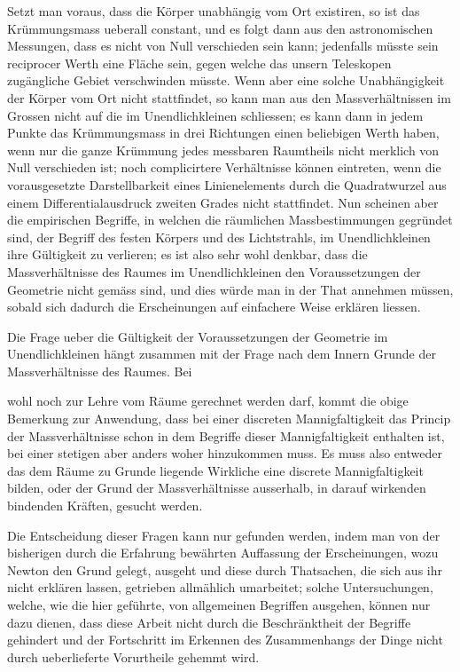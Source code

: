 \documentclass[12pt,a4paper]{article}
\begin{document}
Setzt man voraus, dass die K\"orper unabh\"angig vom Ort existiren, so ist das Kr\"ummungsmass ueberall constant, und es folgt dann aus den astronomischen Messungen, dass es nicht von Null verschieden sein kann; jedenfalls m\"usste sein reciprocer Werth eine Fl\"ache sein, gegen welche das unsern Teleskopen zug\"angliche Gebiet verschwinden m\"usste. Wenn aber eine solche Unabh\"angigkeit der K\"orper vom Ort nicht stattfindet, so kann man aus den Massverh\"altnissen im Grossen nicht auf die im Unendlichkleinen schliessen; es kann dann in jedem Punkte das Kr\"ummungsmass in drei Richtungen einen beliebigen Werth haben, wenn nur die ganze Kr\"ummung jedes messbaren Raumtheils nicht merklich von Null verschieden ist; noch complicirtere Verh\"altnisse k\"onnen eintreten, wenn die vorausgesetzte Darstellbarkeit eines Linienelements durch die Quadratwurzel aus einem Differentialausdruck zweiten Grades nicht stattfindet. Nun scheinen aber die empirischen Begriffe, in welchen die r\"aumlichen Massbestimmungen gegr\"undet sind, der Begriff des festen K\"orpers und des Lichtstrahls, im Unendlichkleinen ihre G\"ultigkeit zu verlieren; es ist also sehr wohl denkbar, dass die Massverh\"altnisse des Raumes im Unendlichkleinen den Voraussetzungen der Geometrie nicht gem\"ass sind, und dies w\"urde man in der That annehmen m\"ussen, sobald sich dadurch die Erscheinungen auf einfachere Weise erkl\"aren liessen.

Die Frage ueber die G\"ultigkeit der Voraussetzungen der Geometrie im Unendlichkleinen h\"angt zusammen mit der Frage nach dem Innern Grunde der Massverh\"altnisse des Raumes. Bei

\newpage
\noindent wohl noch zur Lehre vom R\"aume gerechnet werden darf, kommt die obige Bemerkung zur Anwendung, dass bei einer discreten Mannigfaltigkeit das Princip der Massverh\"altnisse schon in dem Begriffe dieser Mannigfaltigkeit enthalten ist, bei einer stetigen aber anders woher hinzukommen muss. Es muss also entweder das dem R\"aume zu Grunde liegende Wirkliche eine discrete Mannigfaltigkeit bilden, oder der Grund der Massverh\"altnisse ausserhalb, in darauf wirkenden bindenden Kr\"aften, gesucht werden.

Die Entscheidung dieser Fragen kann nur gefunden werden, indem man von der bisherigen durch die Erfahrung bew\"ahrten Auffassung der Erscheinungen, wozu Newton den Grund gelegt, ausgeht und diese durch Thatsachen, die sich aus ihr nicht erkl\"aren lassen, getrieben allm\"ahlich umarbeitet; solche Untersuchungen, welche, wie die hier gef\"uhrte, von allgemeinen Begriffen ausgehen, k\"onnen nur dazu dienen, dass diese Arbeit nicht durch die Beschr\"anktheit der Begriffe gehindert und der Fortschritt im Erkennen des Zusammenhangs der Dinge nicht durch ueberlieferte Vorurtheile gehemmt wird.
\end{document}
